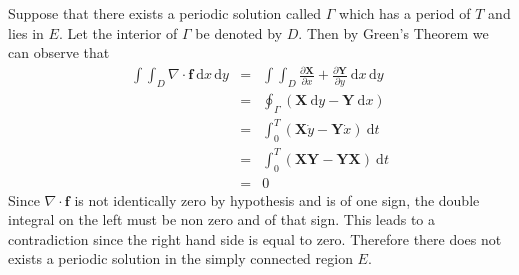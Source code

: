 \documentclass[12pt]{article}
\begin{document}
\newcommand{\ud}{\mathrm{d}}
Suppose that there exists a periodic solution called $\Gamma$ which has a period of $T$ and lies in $E$.  Let the interior of $\Gamma$ be denoted by $D$.  Then by Green's Theorem we can observe that
\begin{eqnarray*}
\int\!\!\!\int_D \nabla \cdot \textbf{f}\: \ud x\, \ud y & = & \int\!\!\!\int_D \frac{\partial \textbf{X}}{\partial x}+\frac{\partial \textbf{Y}}{\partial y}\: \ud x\, \ud y\\
& = & \oint_{\Gamma} (\textbf{X} \: \ud y - \textbf{Y} \: \ud x)\\
& = & \int_0^T (\textbf{X}\dot{y} - \textbf{Y}\dot{x})\: \ud t\\
& = & \int_0^T (\textbf{XY} - \textbf{YX})\: \ud t\\
& = & 0
\end{eqnarray*}
Since $\nabla \cdot \textbf{f}$ is not identically zero by hypothesis and is of one sign, the double integral on the left must be non zero and of that sign.  This leads to a contradiction since the right hand side is equal to zero.  Therefore there does not exists a periodic solution in the simply connected region $E$.
\end{document}
